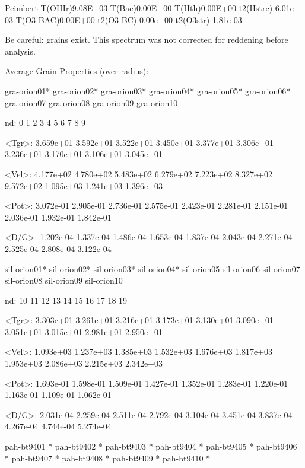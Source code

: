 {Peimbert T(OIIIr)9.08E+03 T(Bac)0.00E+00 T(Hth)0.00E+00 t2(Hstrc) 6.01e-03
T(O3-BAC)0.00E+00 t2(O3-BC) 0.00e+00 t2(O3str) 1.81e-03

 Be careful: grains exist.  This spectrum was not corrected for reddening
before analysis.


Average Grain Properties (over radius):

        gra-orion01* gra-orion02* gra-orion03* gra-orion04* gra-orion05*
gra-orion06* gra-orion07  gra-orion08  gra-orion09  gra-orion10 

    nd:      0            1            2            3            4     
5            6            7            8            9   

 <Tgr>: 3.659e+01    3.592e+01    3.522e+01    3.450e+01    3.377e+01  
3.306e+01    3.236e+01    3.170e+01    3.106e+01    3.045e+01

 <Vel>: 4.177e+02    4.780e+02    5.483e+02    6.279e+02    7.223e+02  
8.327e+02    9.572e+02    1.095e+03    1.241e+03    1.396e+03

 <Pot>: 3.072e-01    2.905e-01    2.736e-01    2.575e-01    2.423e-01  
2.281e-01    2.151e-01    2.036e-01    1.932e-01    1.842e-01

 <D/G>: 1.202e-04    1.337e-04    1.486e-04    1.653e-04    1.837e-04  
2.043e-04    2.271e-04    2.525e-04    2.808e-04    3.122e-04

        sil-orion01* sil-orion02* sil-orion03* sil-orion04* sil-orion05
sil-orion06  sil-orion07  sil-orion08  sil-orion09  sil-orion10 

    nd:     10           11           12           13           14     
15           16           17           18           19   

 <Tgr>: 3.303e+01    3.261e+01    3.216e+01    3.173e+01    3.130e+01  
3.090e+01    3.051e+01    3.015e+01    2.981e+01    2.950e+01

 <Vel>: 1.093e+03    1.237e+03    1.385e+03    1.532e+03    1.676e+03  
1.817e+03    1.953e+03    2.086e+03    2.215e+03    2.342e+03

 <Pot>: 1.693e-01    1.598e-01    1.509e-01    1.427e-01    1.352e-01  
1.283e-01    1.220e-01    1.163e-01    1.109e-01    1.062e-01

 <D/G>: 2.031e-04    2.259e-04    2.511e-04    2.792e-04    3.104e-04  
3.451e-04    3.837e-04    4.267e-04    4.744e-04    5.274e-04

        pah-bt9401 * pah-bt9402 * pah-bt9403 * pah-bt9404 * pah-bt9405 *
pah-bt9406 * pah-bt9407 * pah-bt9408 * pah-bt9409 * pah-bt9410 *

}
